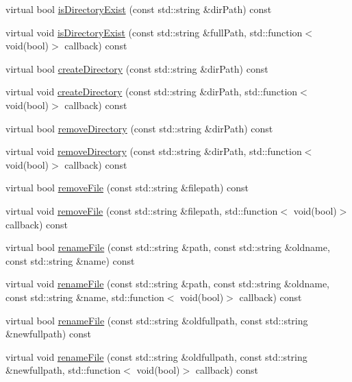 \begin{DoxyCompactItemize}
\item 
virtual bool \hyperlink{classFileUtils_a24d3890687e080dccd916ce946012c96}{is\+Directory\+Exist} (const std\+::string \&dir\+Path) const
\item 
virtual void \hyperlink{classFileUtils_ae611008ddcaf05f7361876b1f2d37753}{is\+Directory\+Exist} (const std\+::string \&full\+Path, std\+::function$<$ void(bool)$>$ callback) const
\item 
virtual bool \hyperlink{classFileUtils_a9d9383b68669dcbef30165514f26d7f6}{create\+Directory} (const std\+::string \&dir\+Path) const
\item 
virtual void \hyperlink{classFileUtils_a22d5e9d49b1239b73d123c321e1a802c}{create\+Directory} (const std\+::string \&dir\+Path, std\+::function$<$ void(bool)$>$ callback) const
\item 
virtual bool \hyperlink{classFileUtils_a0ced661e913489e0a86ef0273c0fb90f}{remove\+Directory} (const std\+::string \&dir\+Path) const
\item 
virtual void \hyperlink{classFileUtils_aa7f1736afe9208df38fd88f2da3a8524}{remove\+Directory} (const std\+::string \&dir\+Path, std\+::function$<$ void(bool)$>$ callback) const
\item 
virtual bool \hyperlink{classFileUtils_aa9131b62319c343316a68d45cbe1d6b1}{remove\+File} (const std\+::string \&filepath) const
\item 
virtual void \hyperlink{classFileUtils_a9f5c6583d4c07bdb9903a0129d34ec17}{remove\+File} (const std\+::string \&filepath, std\+::function$<$ void(bool)$>$ callback) const
\item 
virtual bool \hyperlink{classFileUtils_a9228ab64b14c71afca8c5e4f7fb9bb55}{rename\+File} (const std\+::string \&path, const std\+::string \&oldname, const std\+::string \&name) const
\item 
virtual void \hyperlink{classFileUtils_ab48eedb6cf7d2667c49d68476faa22da}{rename\+File} (const std\+::string \&path, const std\+::string \&oldname, const std\+::string \&name, std\+::function$<$ void(bool)$>$ callback) const
\item 
virtual bool \hyperlink{classFileUtils_a3e68a89a46e1d78df898cbbe1776d75e}{rename\+File} (const std\+::string \&oldfullpath, const std\+::string \&newfullpath) const
\item 
virtual void \hyperlink{classFileUtils_a50eae0c881fdb024de1be74e315db3b9}{rename\+File} (const std\+::string \&oldfullpath, const std\+::string \&newfullpath, std\+::function$<$ void(bool)$>$ callback) const
\item 

\end{DoxyCompactItemize}
